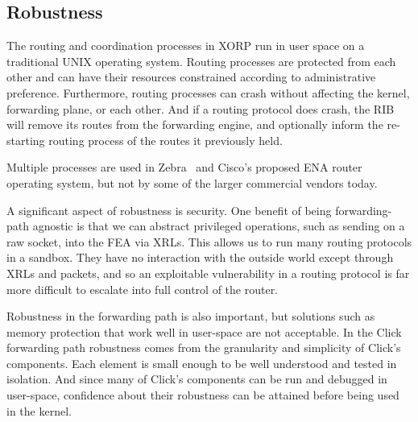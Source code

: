 \subsection{Robustness}

The routing and coordination processes in XORP run in user space on a
traditional UNIX operating system.  Routing processes are protected
from each other and can have their resources constrained according to
administrative preference.  Furthermore, routing processes can crash
without affecting the kernel, forwarding plane, or each other.  And if
a routing protocol does crash, the RIB will remove its routes
from the forwarding engine, and optionally inform the re-starting
routing process of the routes it previously held.

Multiple processes are used in Zebra~\cite{zebra} and Cisco's proposed ENA
router operating system, but not by some of the larger
commercial vendors today.

A significant aspect of robustness is security.  One benefit of
being forwarding-path agnostic is that we can abstract
privileged operations, such as sending on a raw socket, into
the FEA via XRLs.  This allows us to run many routing protocols
in a sandbox. They have no interaction with the outside world except
through XRLs and packets, and so an exploitable vulnerability in a routing
protocol is far more difficult to escalate into full control of the
router.

Robustness in the forwarding path is also important, but solutions
such as memory protection that work well in user-space are not
acceptable.  In the Click forwarding path robustness comes from the
granularity and simplicity of Click's components.  Each element is
small enough to be well understood and tested in isolation.  And since
many of Click's components can be run and debugged in user-space,
confidence about their robustness can be attained before being used in
the kernel.



